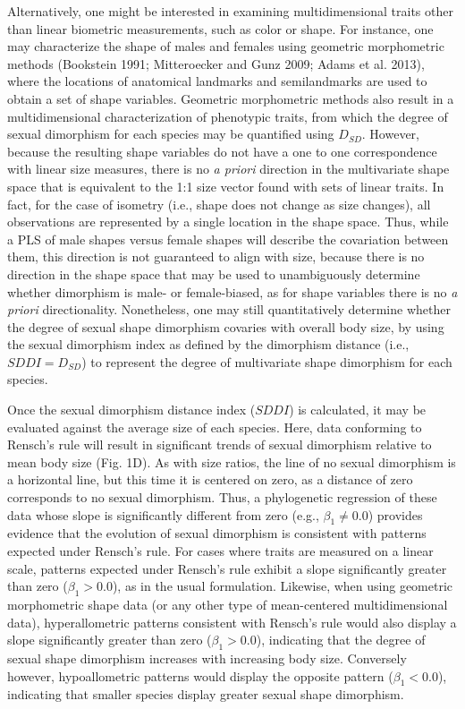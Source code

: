 \documentclass[]{article}
\begin{document}
Alternatively, one might be interested in examining multidimensional
traits other than linear biometric measurements, such as color or shape.
For instance, one may characterize the shape of males and females using
geometric morphometric methods (Bookstein 1991; Mitteroecker and Gunz
2009; Adams et al. 2013), where the locations of anatomical landmarks
and semilandmarks are used to obtain a set of shape variables. Geometric
morphometric methods also result in a multidimensional characterization
of phenotypic traits, from which the degree of sexual dimorphism for
each species may be quantified using \(D_{SD}\). However, because the
resulting shape variables do not have a one to one correspondence with
linear size measures, there is no \emph{a priori} direction in the
multivariate shape space that is equivalent to the 1:1 size vector found
with sets of linear traits. In fact, for the case of isometry (i.e.,
shape does not change as size changes), all observations are represented
by a single location in the shape space. Thus, while a PLS of male
shapes versus female shapes will describe the covariation between them,
this direction is not guaranteed to align with size, because there is no
direction in the shape space that may be used to unambiguously determine
whether dimorphism is male- or female-biased, as for shape variables
there is no \emph{a priori} directionality. Nonetheless, one may still
quantitatively determine whether the degree of sexual shape dimorphism
covaries with overall body size, by using the sexual dimorphism index as
defined by the dimorphism distance (i.e., \(SDDI=D_{SD}\)) to represent
the degree of multivariate shape dimorphism for each species.
\hfill\break

Once the sexual dimorphism distance index (\(SDDI\)) is calculated, it
may be evaluated against the average size of each species. Here, data
conforming to Rensch's rule will result in significant trends of sexual
dimorphism relative to mean body size (Fig. 1D). As with size ratios,
the line of no sexual dimorphism is a horizontal line, but this time it
is centered on zero, as a distance of zero corresponds to no sexual
dimorphism. Thus, a phylogenetic regression of these data whose slope is
significantly different from zero (e.g., \(\beta_{1}\neq0.0\)) provides
evidence that the evolution of sexual dimorphism is consistent with
patterns expected under Rensch's rule. For cases where traits are
measured on a linear scale, patterns expected under Rensch's rule
exhibit a slope significantly greater than zero (\(\beta_{1}>0.0\)), as
in the usual formulation. Likewise, when using geometric morphometric
shape data (or any other type of mean-centered multidimensional data),
hyperallometric patterns consistent with Rensch's rule would also
display a slope significantly greater than zero (\(\beta_{1}>0.0\)),
indicating that the degree of sexual shape dimorphism increases with
increasing body size. Conversely however, hypoallometric patterns would
display the opposite pattern (\(\beta_{1}<0.0\)), indicating that
smaller species display greater sexual shape dimorphism. \hfill\break
\end{document}
